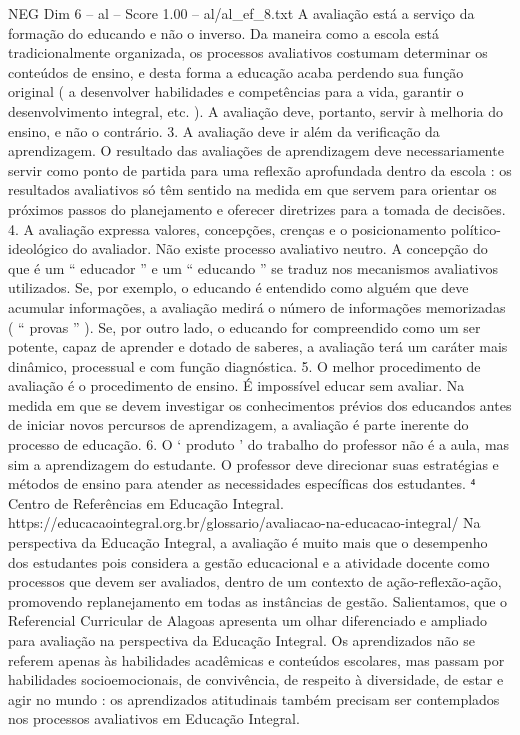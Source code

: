 \begin{textsample}{NEG Dim 6 – al – Score 1.00 – al/al\_ef\_8.txt}
A avaliação está a serviço da formação do educando e não o inverso.
Da maneira como a escola está tradicionalmente organizada, os processos avaliativos costumam determinar os conteúdos de ensino, e desta forma a educação acaba perdendo sua função original ( a desenvolver habilidades e competências para a vida, garantir o desenvolvimento integral, etc. ).
A avaliação deve, portanto, servir à melhoria do ensino, e não o contrário. 3.
A avaliação deve ir além da verificação da aprendizagem.
O resultado das avaliações de aprendizagem deve necessariamente servir como ponto de partida para uma reflexão aprofundada dentro da escola : os resultados avaliativos só têm sentido na medida em que servem para orientar os próximos passos do planejamento e oferecer diretrizes para a tomada de decisões. 4.
A avaliação expressa valores, concepções, crenças e o posicionamento político-ideológico do avaliador.
Não existe processo avaliativo neutro.
A concepção do que é um “ educador ” e um “ educando ” se traduz nos mecanismos avaliativos utilizados.
Se, por exemplo, o educando é entendido como alguém que deve acumular informações, a avaliação medirá o número de informações memorizadas ( “ provas ” ).
Se, por outro lado, o educando for compreendido como um ser potente, capaz de aprender e dotado de saberes, a avaliação terá um caráter mais dinâmico, processual e com função diagnóstica. 5.
O melhor procedimento de avaliação é o procedimento de ensino.
É impossível educar sem avaliar.
Na medida em que se devem investigar os conhecimentos prévios dos educandos antes de iniciar novos percursos de aprendizagem, a avaliação é parte inerente do processo de educação. 6.
O ‘ produto ’ do trabalho do professor não é a aula, mas sim a aprendizagem do estudante.
O professor deve direcionar suas estratégias e métodos de ensino para atender as necessidades específicas dos estudantes. ⁴ Centro de Referências em Educação Integral. https://educacaointegral.org.br/glossario/avaliacao-na-educacao-integral/ Na perspectiva da Educação Integral, a avaliação é muito mais que o desempenho dos estudantes pois considera a gestão educacional e a atividade docente como processos que devem ser avaliados, dentro de um contexto de ação-reflexão-ação, promovendo replanejamento em todas as instâncias de gestão.
Salientamos, que o Referencial Curricular de Alagoas apresenta um olhar diferenciado e ampliado para avaliação na perspectiva da Educação Integral.
Os aprendizados não se referem apenas às habilidades acadêmicas e conteúdos escolares, mas passam por habilidades socioemocionais, de convivência, de respeito à diversidade, de estar e agir no mundo : os aprendizados atitudinais também precisam ser contemplados nos processos avaliativos em Educação Integral.

\end{textsample}
